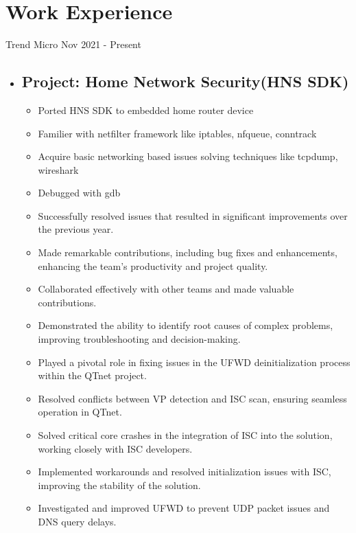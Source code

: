\section{Work Experience}

{Trend Micro}
{Nov 2021 - Present}
{}

\begin{itemize}
  \item \subsection*{\textbf{Project: Home Network Security(HNS SDK)}}
    \begin{itemize}
        \setlength\topsep{0em}
        \setlength\parskip{0em}
        \setlength\parsep{0em}
        \setlength\itemsep{0em}
      \item Ported HNS SDK to embedded home router device
      \item Familier with netfilter framework like iptables, nfqueue, conntrack
      \item Acquire basic networking based issues solving techniques like tcpdump, wireshark
      \item Debugged with gdb
      \item Successfully resolved issues that resulted in significant improvements over the previous year.
      \item Made remarkable contributions, including bug fixes and enhancements, enhancing the team's productivity and project quality.
      \item Collaborated effectively with other teams and made valuable contributions.
      \item Demonstrated the ability to identify root causes of complex problems, improving troubleshooting and decision-making.
      \item Played a pivotal role in fixing issues in the UFWD deinitialization process within the QTnet project.
      \item Resolved conflicts between VP detection and ISC scan, ensuring seamless operation in QTnet.
      \item Solved critical core crashes in the integration of ISC into the solution, working closely with ISC developers.
      \item Implemented workarounds and resolved initialization issues with ISC, improving the stability of the solution.
      \item Investigated and improved UFWD to prevent UDP packet issues and DNS query delays.

\end{itemize}
\end{itemize}
